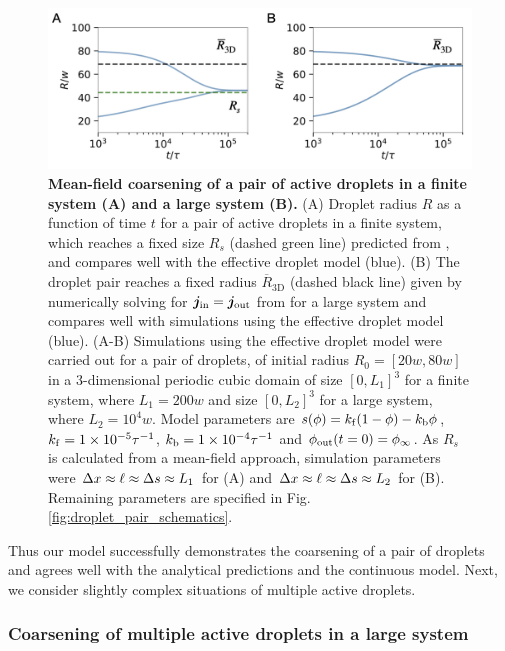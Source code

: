 \begin{figure}[tb]
\centering
\includegraphics[scale=0.5]{MainContent/Figures/active_droplet_pair.pdf}
\caption{\textbf{Mean-field coarsening of a pair of active droplets in a finite system (A) and a large system (B).}
(A) Droplet radius $R$ as a function of time $t$ for a pair of active droplets in a finite system, which reaches a fixed size $R_s$ (dashed green line) predicted from , and compares well with the effective droplet model (blue).
(B) The droplet pair reaches a fixed radius $\overline{R}_\mathrm{3D}$ (dashed black line) given by numerically solving for $\boldsymbol{j}_\mathrm{in} = \boldsymbol{j}_\mathrm{out}$ from  for a large system and compares well with simulations using the effective droplet model (blue).
\mbox{(A-B)}
Simulations using the effective droplet model were carried out for a pair of droplets, of initial radius $R_0 = [20w, 80w]$ in a $3$-dimensional periodic cubic domain of size $[0, L_1]^3$ for a finite system, where $L_1 = 200 w$ and size $[0, L_2]^3$ for a large system, where $L_2 = 10^4 w$.
Model parameters are $s(\phi)= k_\mathrm{f} (1 - \phi) - k_\mathrm{b} \phi$, $k_\mathrm{f} = 1 \times 10^{-5} \tau^{-1}$, $k_\mathrm{b} = 1 \times 10^{-4}  \tau^{-1}$ and $\phi_\mathrm{out}(t=0) = \phi_\infty$.
As $R_s$ is calculated from a mean-field approach, simulation parameters were $\Delta x \approx \ell \approx \Delta s \approx L_1$ for (A) and  $\Delta x \approx \ell \approx \Delta s \approx L_2$ for (B).
Remaining parameters are specified in Fig. \ref{fig:droplet_pair_schematics}.
}
\label{fig:active_droplet_pair}
\end{figure}
Thus our model successfully demonstrates the coarsening of a pair of droplets and agrees well with the analytical predictions and the continuous model.
Next, we consider slightly complex situations of multiple active droplets.


\subsubsection{Coarsening of multiple active droplets in a large system}

